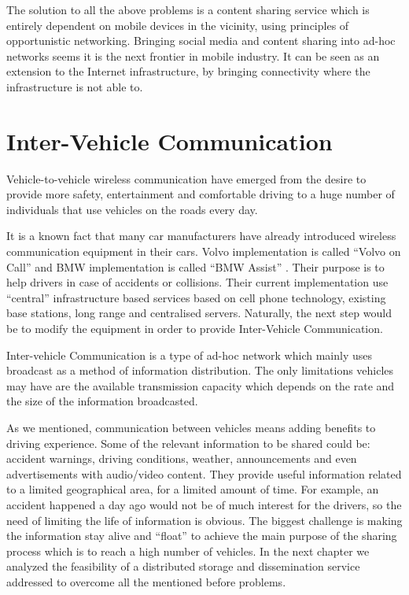 The solution to all the above problems is a content sharing service which is
entirely dependent on mobile devices in the vicinity, using principles of
opportunistic networking. Bringing social media and content sharing into ad-hoc
networks seems it is the next frontier in mobile industry. It can be seen as an
extension to the Internet infrastructure, by bringing connectivity where the
infrastructure is not able to.

\section{Inter-Vehicle Communication}

Vehicle-to-vehicle wireless communication have emerged from the desire to
provide more safety, entertainment and comfortable driving to a huge number of
individuals that use vehicles on the roads every day.

It is a known fact that many car manufacturers have already introduced wireless
communication equipment in their cars. Volvo implementation is called ``Volvo on
Call'' \citep{volvo} and BMW implementation is called ``BMW Assist''
\cite{bmw_assist}. Their purpose is to help drivers in case of accidents or
collisions. Their current implementation use ``central'' infrastructure based
services based on cell phone technology, existing base stations, long range and
centralised servers. Naturally, the next step would be to modify the equipment
in order to provide Inter-Vehicle Communication.

Inter-vehicle Communication is a type of ad-hoc network which mainly uses
broadcast as a method of information distribution. The only limitations vehicles
may have are the available transmission capacity which depends on the rate and
the size of the information broadcasted.

As we mentioned, communication between vehicles means adding benefits to driving
experience. Some of the relevant information to be shared could be: accident
warnings, driving conditions, weather, announcements and even advertisements
with audio/video content. They provide useful information related to a limited
geographical area, for a limited amount of time. For example, an accident
happened a day ago would not be of much interest for the drivers, so the need of
limiting the life of information is obvious.
The biggest challenge is making the information stay alive and ``float'' to
achieve the main purpose of the sharing process which is to reach a high number
of vehicles. In the next chapter we analyzed the feasibility of a distributed
storage and dissemination service addressed to overcome all the mentioned before
problems.


